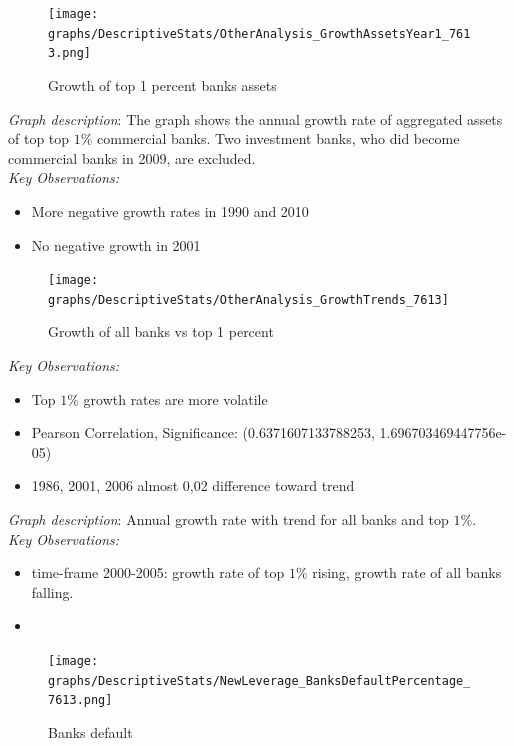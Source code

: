 \documentclass[12pt, a4paper]{article} %
\begin{document}
\begin{figure}[hbtp]
\centering
\caption{Growth of top 1 percent banks assets}
\texttt{[image: graphs/DescriptiveStats/OtherAnalysis\_GrowthAssetsYear1\_7613.png]}
\end{figure}

\noindent \textit{Graph description}: The graph shows the annual growth rate of aggregated assets of top top $1\%$ commercial banks. Two investment banks, who did become commercial banks in 2009, are excluded. \\

\noindent \textit{Key Observations:}
\begin{itemize}
\item More negative growth rates in 1990 and 2010
\item No negative growth in 2001

\end{itemize}

\begin{figure}[hbtp]
\centering
\caption{Growth of all banks vs top 1 percent}
\texttt{[image: graphs/DescriptiveStats/OtherAnalysis\_GrowthTrends\_7613]}
\end{figure}

\noindent \textit{Key Observations:}
\begin{itemize}
\item Top $1\%$ growth rates are more volatile
\item Pearson Correlation, Significance: (0.6371607133788253, 1.696703469447756e-05)
\item 1986, 2001, 2006 almost 0,02 difference toward trend
\end{itemize}

\noindent \textit{Graph description}: Annual growth rate with trend for all banks and top $1\%$. \\

\noindent \textit{Key Observations:}
\begin{itemize}
\item time-frame 2000-2005: growth rate of top $1\%$ rising, growth rate of all banks falling.
\item 
\end{itemize}


\begin{figure}[hbtp]
\centering
\caption{Banks default}
\texttt{[image: graphs/DescriptiveStats/NewLeverage\_BanksDefaultPercentage\_7613.png]}
\end{figure}
\end{document}
